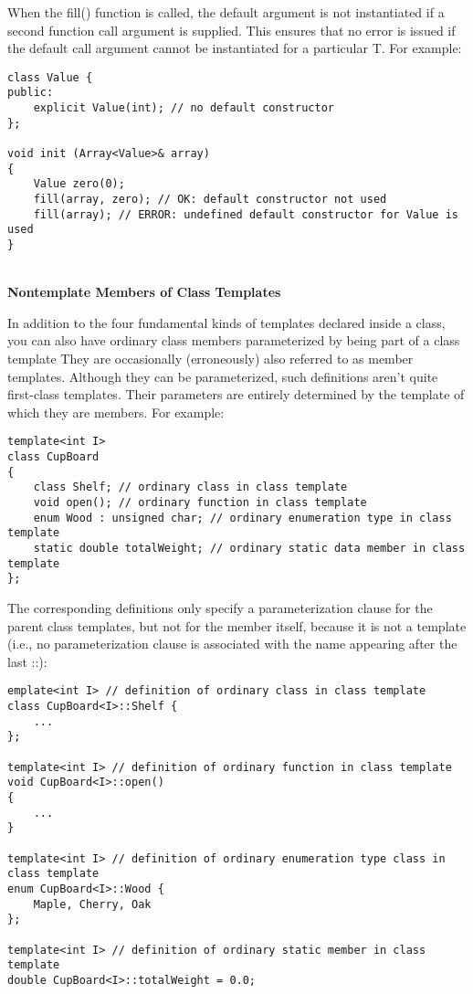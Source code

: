 When the fill() function is called, the default argument is not instantiated if a second function call argument is supplied. This ensures that no error is issued if the default call argument cannot be instantiated for a particular T. For example:

\begin{lstlisting}[style=styleCXX]
class Value {
public:
	explicit Value(int); // no default constructor
};

void init (Array<Value>& array)
{
	Value zero(0);
	fill(array, zero); // OK: default constructor not used
	fill(array); // ERROR: undefined default constructor for Value is used
}
\end{lstlisting}

\hspace*{\fill} \\ %
\noindent
\textbf{Nontemplate Members of Class Templates}

In addition to the four fundamental kinds of templates declared inside a class, you can also have ordinary class members parameterized by being part of a class template They are occasionally (erroneously) also referred to as member templates. Although they can be parameterized, such definitions aren’t quite first-class templates. Their parameters are entirely determined by the template of which they are members. For example:

\begin{lstlisting}[style=styleCXX]
template<int I>
class CupBoard
{
	class Shelf; // ordinary class in class template
	void open(); // ordinary function in class template
	enum Wood : unsigned char; // ordinary enumeration type in class template
	static double totalWeight; // ordinary static data member in class template
};
\end{lstlisting}

The corresponding definitions only specify a parameterization clause for the parent class templates, but not for the member itself, because it is not a template (i.e., no parameterization clause is associated with the name appearing after the last ::):

\begin{lstlisting}[style=styleCXX]
emplate<int I> // definition of ordinary class in class template
class CupBoard<I>::Shelf {
	...
};

template<int I> // definition of ordinary function in class template
void CupBoard<I>::open()
{
	...
}

template<int I> // definition of ordinary enumeration type class in class template
enum CupBoard<I>::Wood {
	Maple, Cherry, Oak
};

template<int I> // definition of ordinary static member in class template
double CupBoard<I>::totalWeight = 0.0;
\end{lstlisting}


